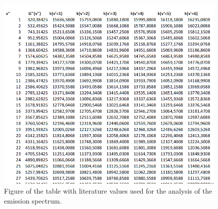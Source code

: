 \begin{figure}[ht]
	\includegraphics[scale=0.8]{Bild/DATA.png}
	\centering
	\caption[Table with Literature Values]{Figure of the table with literature values used for the analysis of the emission spectrum.\cite{Anleitung}}
	\label{TableSTAATSEXAMEN}
\end{figure}